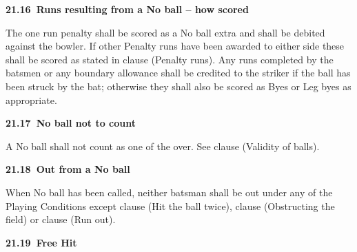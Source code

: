 \documentclass[12pt]{article}
\begin{document}
\vspace{\baselineskip}
{\fontsize{11pt}{13.2pt}\selectfont \textbf{21.16\  Runs resulting from a No ball – how scored}\par}\par


\vspace{\baselineskip}
\begin{adjustwidth}{0.0in}{0.03in}
{\fontsize{9pt}{10.8pt}\selectfont The one run penalty shall be scored as a No ball extra and shall be debited against the bowler. If other Penalty runs have been awarded to either side these shall be scored as stated in clause (Penalty runs). Any runs completed by the batsmen or any boundary allowance shall be credited to the striker if the ball has been struck by the bat; otherwise they shall also be scored as Byes or Leg byes as appropriate.\par}\par

\end{adjustwidth}


\vspace{\baselineskip}
{\fontsize{11pt}{13.2pt}\selectfont \textbf{21.17\  No ball not to count}\par}\par


\vspace{\baselineskip}
{\fontsize{9pt}{10.8pt}\selectfont A No ball shall not count as one of the over. See clause (Validity of balls).\par}\par


\vspace{\baselineskip}
{\fontsize{11pt}{13.2pt}\selectfont \textbf{21.18\  Out from a No ball}\par}\par


\vspace{\baselineskip}
\begin{adjustwidth}{0.0in}{0.22in}
{\fontsize{9pt}{10.8pt}\selectfont When No ball has been called, neither batsman shall be out under any of the Playing Conditions except clause  (Hit the ball twice), clause (Obstructing the field) or clause (Run out).\par}\par

\end{adjustwidth}


\vspace{\baselineskip}
{\fontsize{11pt}{13.2pt}\selectfont \textbf{21.19\  Free Hit}\par}\par
\end{document}
